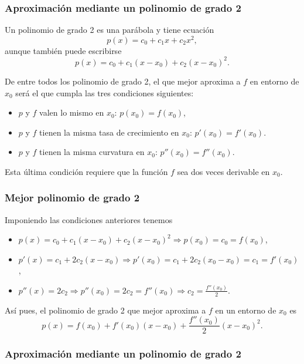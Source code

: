 \begin{frame}
\frametitle{Aproximación mediante un polinomio de grado 2}
Un polinomio de grado 2 es una parábola y tiene ecuación
\[
p(x) = c_0+c_1x+c_2x^2,
\]
aunque también puede escribirse
\[
p(x) = c_0+c_1(x-x_0)+c_2(x-x_0)^2.
\]

De entre todos los polinomio de grado 2, el que mejor aproxima a $f$ en entorno de $x_0$ será el que cumpla las tres condiciones siguientes:
\begin{itemize}
\item[\structure{1-}] $p$ y $f$ valen lo mismo en $x_0$: $p(x_0) = f(x_0)$,
\item[\structure{2-}] $p$ y $f$ tienen la misma tasa de crecimiento en $x_0$: $p'(x_0) = f'(x_0)$.
\item[\structure{3-}] $p$ y $f$ tienen la misma curvatura en $x_0$: $p''(x_0)=f''(x_0)$.
\end{itemize}
Esta última condición requiere que la función $f$ sea dos veces derivable en $x_0$.
\end{frame}


\begin{frame}
\frametitle{Mejor polinomio de grado 2}
Imponiendo las condiciones anteriores tenemos
\begin{itemize}
\item[\structure{1-}] $p(x)=c_0+c_1(x-x_0)+c_2(x-x_0)^2 \Rightarrow p(x_0)=c_0=f(x_0)$,
\item[\structure{2-}] $p'(x)=c_1+2c_2(x-x_0) \Rightarrow p'(x_0)=c_1+2c_2(x_0-x_0)=c_1=f'(x_0)$,
\item[\structure{3-}] $p''(x)=2c_2 \Rightarrow p''(x_0)=2c_2=f''(x_0) \Rightarrow c_2=\frac{f''(x_0)}{2}$.
\end{itemize}

Así pues, el polinomio de grado 2 que mejor aproxima a $f$ en un entorno de $x_0$ es
\[
p(x) = f(x_0)+f'(x_0)(x-x_0)+\frac{f''(x_0)}{2}(x-x_0)^2.
\]
\end{frame}


\begin{frame}
\frametitle{Aproximación mediante un polinomio de grado 2}
\begin{center}
\scalebox{1}{}
\end{center}
\end{frame}


